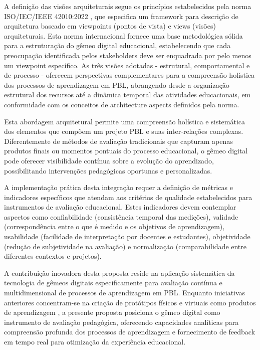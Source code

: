 \documentclass[12pt,a4paper]{article}
\begin{document}
A definição das visões arquiteturais segue os princípios estabelecidos pela norma ISO/IEC/IEEE 42010:2022 \cite{iso42010}, que especifica um framework para descrição de arquitetura baseado em viewpoints (pontos de vista) e views (visões) arquiteturais. Esta norma internacional fornece uma base metodológica sólida para a estruturação do gêmeo digital educacional, estabelecendo que cada preocupação identificada pelos stakeholders deve ser enquadrada por pelo menos um viewpoint específico. As três visões adotadas - estrutural, comportamental e de processo - oferecem perspectivas complementares para a compreensão holística dos processos de aprendizagem em PBL, abrangendo desde a organização estrutural dos recursos até a dinâmica temporal das atividades educacionais, em conformidade com os conceitos de architecture aspects definidos pela norma.

Esta abordagem arquitetural permite uma compreensão holística e sistemática dos elementos que compõem um projeto PBL e suas inter-relações complexas. Diferentemente de métodos de avaliação tradicionais que capturam apenas produtos finais ou momentos pontuais do processo educacional, o gêmeo digital pode oferecer visibilidade contínua sobre a evolução do aprendizado, possibilitando intervenções pedagógicas oportunas e personalizadas.

A implementação prática desta integração requer a definição de métricas e indicadores específicos que atendam aos critérios de qualidade estabelecidos para instrumentos de avaliação educacional. Estes indicadores devem contemplar aspectos como confiabilidade (consistência temporal das medições), validade (correspondência entre o que é medido e os objetivos de aprendizagem), usabilidade (facilidade de interpretação por docentes e estudantes), objetividade (redução de subjetividade na avaliação) e normalização (comparabilidade entre diferentes contextos e projetos).

A contribuição inovadora desta proposta reside na aplicação sistemática da tecnologia de gêmeos digitais especificamente para avaliação contínua e multidimensional de processos de aprendizagem em PBL. Enquanto iniciativas anteriores concentram-se na criação de protótipos físicos e virtuais como produtos de aprendizagem \cite{bachmann2023}, a presente proposta posiciona o gêmeo digital como instrumento de avaliação pedagógica, oferecendo capacidades analíticas para compreensão profunda dos processos de aprendizagem e fornecimento de feedback em tempo real para otimização da experiência educacional.
\end{document}
